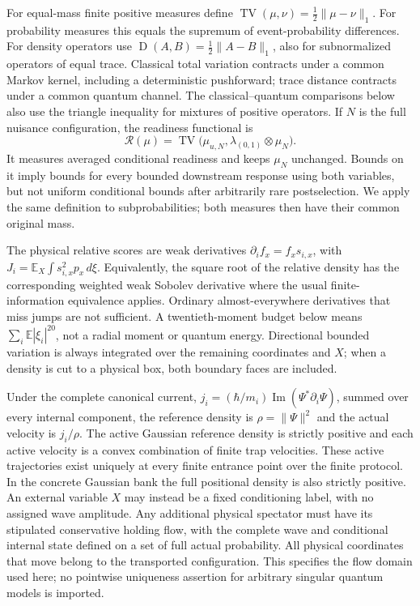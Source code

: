 \documentclass[11pt]{article}
\numberwithin{equation}{section}
\theoremstyle{definition}
\theoremstyle{remark}
\newcommand{\TV}{\operatorname{TV}}
\newcommand{\Dtr}{\operatorname{D}}
\begin{document}
For equal-mass finite positive measures define $\TV(\mu,\nu)=\frac12\lVert\mu-\nu\rVert_1$. For probability measures this equals the supremum of event-probability differences. For density operators use $\Dtr(A,B)=\frac12\lVert A-B\rVert_1$, also for subnormalized operators of equal trace. Classical total variation contracts under a common Markov kernel, including a deterministic pushforward; trace distance contracts under a common quantum channel. The classical--quantum comparisons below also use the triangle inequality for mixtures of positive operators. If $N$ is the full nuisance configuration, the readiness functional is
\begin{equation}\label{eq:readiness-definition}
 \mathcal R(\mu)=\TV\bigl(\mu_{u,N},\lambda_{(0,1)}\otimes\mu_N\bigr).
\end{equation}
It measures averaged conditional readiness and keeps $\mu_N$ unchanged. Bounds on it imply bounds for every bounded downstream response using both variables, but not uniform conditional bounds after arbitrarily rare postselection. We apply the same definition to subprobabilities; both measures then have their common original mass.

The physical relative scores are weak derivatives $\partial_i f_x=f_x s_{i,x}$, with $J_i=\mathbb E_X\int s_{i,x}^2p_x\,d\xi$. Equivalently, the square root of the relative density has the corresponding weighted weak Sobolev derivative where the usual finite-information equivalence applies. Ordinary almost-everywhere derivatives that miss jumps are not sufficient. A twentieth-moment budget below means $\sum_i\mathbb E|\xi_i|^{20}$, not a radial moment or quantum energy. Directional bounded variation is always integrated over the remaining coordinates and $X$; when a density is cut to a physical box, both boundary faces are included.

Under the complete canonical current, $j_i=(\hbar/m_i)\operatorname{Im}(\Psi^*\partial_i\Psi)$, summed over every internal component, the reference density is $\rho=\lVert\Psi\rVert^2$ and the actual velocity is $j_i/\rho$. The active Gaussian reference density is strictly positive and each active velocity is a convex combination of finite trap velocities. These active trajectories exist uniquely at every finite entrance point over the finite protocol. In the concrete Gaussian bank the full positional density is also strictly positive. An external variable $X$ may instead be a fixed conditioning label, with no assigned wave amplitude. Any additional physical spectator must have its stipulated conservative holding flow, with the complete wave and conditional internal state defined on a set of full actual probability. All physical coordinates that move belong to the transported configuration. This specifies the flow domain used here; no pointwise uniqueness assertion for arbitrary singular quantum models is imported.
\end{document}
